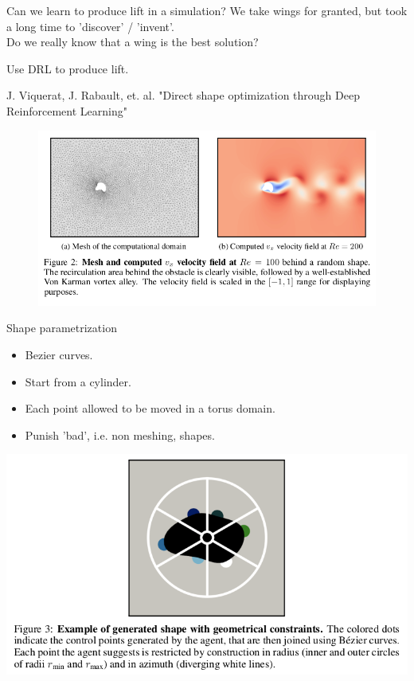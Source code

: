 \documentclass{beamer}
\begin{document}
\begin{frame}{Can we learn to produce lift in a simulation?}
    We take wings for granted, but took a long time to 'discover' / 'invent'. \\
    Do we really know that a wing is the best solution?

    \begin{center}
        Use DRL to produce lift.
    \end{center}

    J. Viquerat, J. Rabault, et. al. "Direct shape optimization through Deep Reinforcement Learning"

    \begin{figure}
    \begin{center}
      \includegraphics[width=.72\textwidth]{Figures/simulation_setup}
    \end{center}
    \end{figure}
\end{frame}

\begin{frame}{Shape parametrization}
    \begin{itemize}
        \item Bezier curves.
        \item Start from a cylinder.
        \item Each point allowed to be moved in a torus domain.
        \item Punish 'bad', i.e. non meshing, shapes.
    \end{itemize}

    \begin{center}
      \includegraphics[width=.78\textwidth]{Figures/shape_discretization}
    \end{center}
\end{frame}
\end{document}
